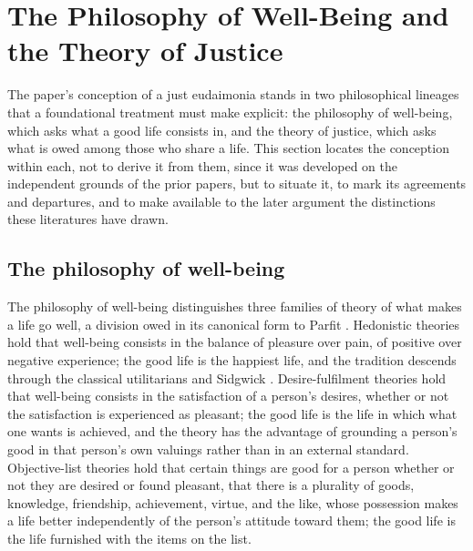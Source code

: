 \section{The Philosophy of Well-Being and the Theory of Justice}
\label{p11:sec:philosophy}

\noindent
The paper's conception of a just eudaimonia stands in two philosophical lineages that a foundational treatment must make explicit: the philosophy of well-being, which asks what a good life consists in, and the theory of justice, which asks what is owed among those who share a life. This section locates the conception within each, not to derive it from them, since it was developed on the independent grounds of the prior papers, but to situate it, to mark its agreements and departures, and to make available to the later argument the distinctions these literatures have drawn.

\subsection{The philosophy of well-being}
\label{p11:sec:phil-wellbeing}

The philosophy of well-being distinguishes three families of theory of what makes a life go well, a division owed in its canonical form to Parfit \parencite{parfit1984}. Hedonistic theories hold that well-being consists in the balance of pleasure over pain, of positive over negative experience; the good life is the happiest life, and the tradition descends through the classical utilitarians and Sidgwick \parencite{sidgwick1907}. Desire-fulfilment theories hold that well-being consists in the satisfaction of a person's desires, whether or not the satisfaction is experienced as pleasant; the good life is the life in which what one wants is achieved, and the theory has the advantage of grounding a person's good in that person's own valuings rather than in an external standard. Objective-list theories hold that certain things are good for a person whether or not they are desired or found pleasant, that there is a plurality of goods, knowledge, friendship, achievement, virtue, and the like, whose possession makes a life better independently of the person's attitude toward them; the good life is the life furnished with the items on the list.


